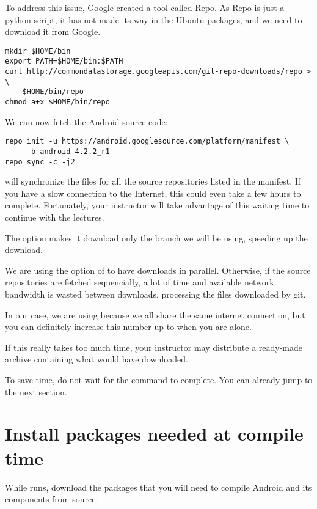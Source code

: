 To address this issue, Google created a tool called Repo. As Repo is
just a python script, it has not made its way in the Ubuntu packages,
and we need to download it from Google.

\begin{verbatim}
mkdir $HOME/bin
export PATH=$HOME/bin:$PATH
curl http://commondatastorage.googleapis.com/git-repo-downloads/repo > \
    $HOME/bin/repo
chmod a+x $HOME/bin/repo
\end{verbatim}

We can now fetch the Android source code:

\begin{verbatim}
repo init -u https://android.googlesource.com/platform/manifest \
     -b android-4.2.2_r1
repo sync -c -j2
\end{verbatim}

 will synchronize the files for all the source
repositories listed in the manifest. If you have a slow connection to
the Internet, this could even take a few hours to
complete. Fortunately, your instructor will take advantage of this
waiting time to continue with the lectures.

The  option makes it download only the branch we will be
using, speeding up the download.

We are using the  option of  to have 
downloads in parallel. Otherwise, if the source repositories are fetched
sequencially, a lot of time and available network bandwidth is wasted
between downloads, processing the files downloaded by git.

In our case, we are using  because we all share the same
internet connection, but you can definitely increase this number up to
\code{8} when you are alone.

If this really takes too much time, your instructor may distribute a
ready-made archive containing what  would have
downloaded.

To save time, do not wait for the  command to
complete. You can already jump to the next section.

\section{Install packages needed at compile time}

While  runs, download the packages that you will need
to compile Android and its components from source:


